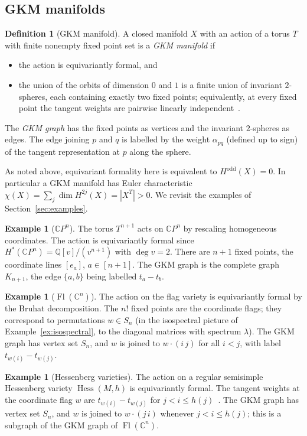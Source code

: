 \documentclass[11pt,a4paper]{article}
\numberwithin{equation}{section}
\theoremstyle{plain}
\theoremstyle{definition}
\newtheorem{definition}[theorem]{Definition}
\newtheorem{example}[theorem]{Example}
\theoremstyle{remark}
\newcommand{\Q}{\mathbb{Q}}
\newcommand{\C}{\mathbb{C}}
\DeclareMathOperator{\Fl}{Fl}
\DeclareMathOperator{\Hess}{Hess}
\begin{document}
\subsection{GKM manifolds}

\begin{definition}[GKM manifold]
A closed manifold $X$ with an action of a torus $T$ with finite nonempty fixed point set is a \emph{GKM manifold} if
\begin{itemize}[nosep]
\item the action is equivariantly formal, and
\item the union of the orbits of dimension $0$ and $1$ is a finite union of invariant $2$-spheres, each containing exactly two fixed points; equivalently, at every fixed point the tangent weights are pairwise linearly independent~\cite{GKM98}.
\end{itemize}
The \emph{GKM graph} has the fixed points as vertices and the invariant $2$-spheres as edges. The edge joining $p$ and $q$ is labelled by the weight $\alpha_{pq}$ (defined up to sign) of the tangent representation at $p$ along the sphere.
\end{definition}

As noted above, equivariant formality here is equivalent to $H^{\mathrm{odd}}(X)=0$. In particular a GKM manifold has Euler characteristic $\chi(X)=\sum_j\dim H^{2j}(X)=|X^T|>0$. We revisit the examples of Section~\ref{sec:examples}.

\begin{example}[$\C P^n$]\label{ex:cpn}
The torus $T^{n+1}$ acts on $\C P^n$ by rescaling homogeneous coordinates. The action is equivariantly formal since $H^*(\C P^n)=\Q[v]/(v^{n+1})$ with $\deg v=2$. There are $n+1$ fixed points, the coordinate lines $[e_a]$, $a\in[n+1]$. The GKM graph is the complete graph $K_{n+1}$, the edge $\{a,b\}$ being labelled $t_a-t_b$.
\end{example}

\begin{example}[$\Fl(\C^n)$]
The action on the flag variety is equivariantly formal by the Bruhat decomposition. The $n!$ fixed points are the coordinate flags; they correspond to permutations $w\in S_n$ (in the isospectral picture of Example~\ref{ex:isospectral}, to the diagonal matrices with spectrum $\lambda$). The GKM graph has vertex set $S_n$, and $w$ is joined to $w\cdot(i\,j)$ for all $i<j$, with label $t_{w(i)}-t_{w(j)}$.
\end{example}

\begin{example}[Hessenberg varieties]\label{ex:hess-gkm}
The action on a regular semisimple Hessenberg variety $\Hess(M,h)$ is equivariantly formal. The tangent weights at the coordinate flag $w$ are $t_{w(i)}-t_{w(j)}$ for $j<i\leqslant h(j)$~\cite{DPS92,Tym08}. The GKM graph has vertex set $S_n$, and $w$ is joined to $w\cdot(j\,i)$ whenever $j<i\leqslant h(j)$; this is a subgraph of the GKM graph of $\Fl(\C^n)$.
\end{example}
\end{document}
